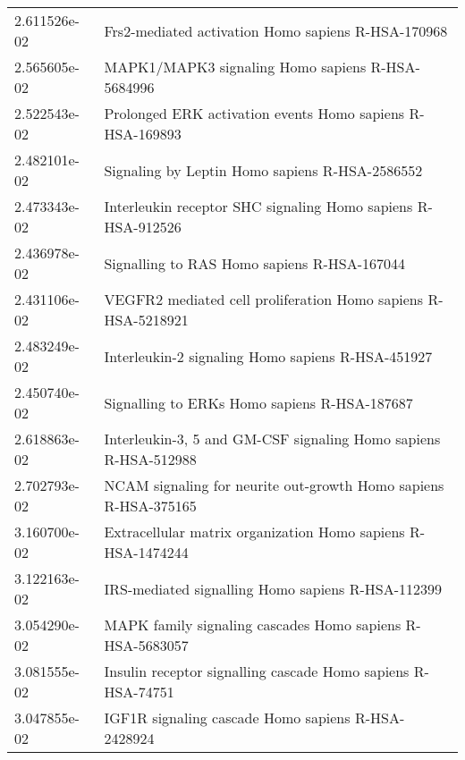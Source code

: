 \begin{longtable}{p{2.4cm}p{14.5cm}}
             2.611526e-02 &                                            Frs2-mediated activation Homo sapiens R-HSA-170968 \\
             2.565605e-02 &                                              MAPK1/MAPK3 signaling Homo sapiens R-HSA-5684996 \\
             2.522543e-02 &                                     Prolonged ERK activation events Homo sapiens R-HSA-169893 \\
             2.482101e-02 &                                                Signaling by Leptin Homo sapiens R-HSA-2586552 \\
             2.473343e-02 &                                  Interleukin receptor SHC signaling Homo sapiens R-HSA-912526 \\
             2.436978e-02 &                                                   Signalling to RAS Homo sapiens R-HSA-167044 \\
             2.431106e-02 &                                 VEGFR2 mediated cell proliferation Homo sapiens R-HSA-5218921 \\
             2.483249e-02 &                                             Interleukin-2 signaling Homo sapiens R-HSA-451927 \\
             2.450740e-02 &                                                  Signalling to ERKs Homo sapiens R-HSA-187687 \\
             2.618863e-02 &                               Interleukin-3, 5 and GM-CSF signaling Homo sapiens R-HSA-512988 \\
             2.702793e-02 &                               NCAM signaling for neurite out-growth Homo sapiens R-HSA-375165 \\
             3.160700e-02 &                                  Extracellular matrix organization Homo sapiens R-HSA-1474244 \\
             3.122163e-02 &                                             IRS-mediated signalling Homo sapiens R-HSA-112399 \\
             3.054290e-02 &                                     MAPK family signaling cascades Homo sapiens R-HSA-5683057 \\
             3.081555e-02 &                                  Insulin receptor signalling cascade Homo sapiens R-HSA-74751 \\
             3.047855e-02 &                                            IGF1R signaling cascade Homo sapiens R-HSA-2428924 \\

\end{longtable}
